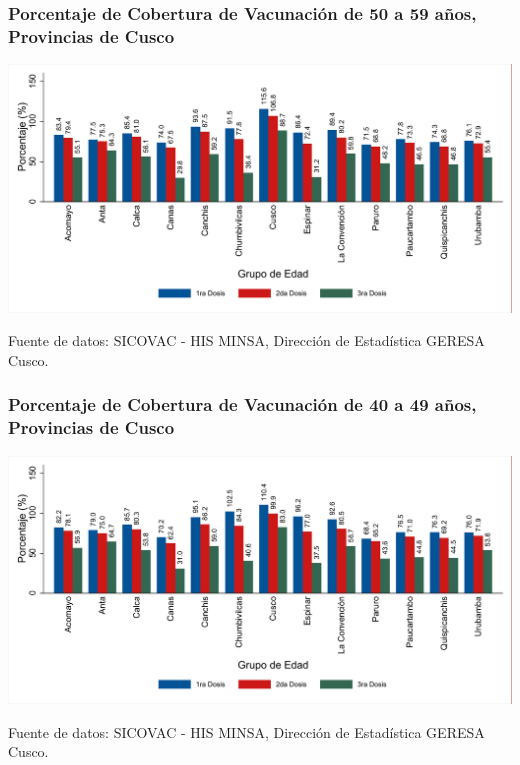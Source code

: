 \documentclass[xcolor=table]{beamer}
\begin{document}
\begin{frame}[label=vacunas_60]
	\frametitle{Porcentaje de Cobertura de Vacunación de 50 a 59 años, Provincias de Cusco}
	\vspace{-.5cm}
	\begin{center}
		\includegraphics[width=1.0\linewidth, trim={.2cm .5cm .2cm .2cm},clip]{../figuras/vacunacion_provincial_edad_practica_6.pdf}
	\end{center}
	{\tiny Fuente de datos: SICOVAC - HIS MINSA, Dirección de Estadística GERESA Cusco. \\}
	\hyperlink{cobertura_vacuna_provincias}{}
\end{frame}

\begin{frame}[label=vacunas_50]
	\frametitle{Porcentaje de Cobertura de Vacunación de 40 a 49 años, Provincias de Cusco}
	\vspace{-.5cm}
	\begin{center}
		\includegraphics[width=1.0\linewidth, trim={.2cm .5cm .2cm .2cm},clip]{../figuras/vacunacion_provincial_edad_practica_5.pdf}
	\end{center}
	{\tiny Fuente de datos: SICOVAC - HIS MINSA, Dirección de Estadística GERESA Cusco. \\}
\hyperlink{cobertura_vacuna_provincias}{}
\end{frame}
\end{document}
